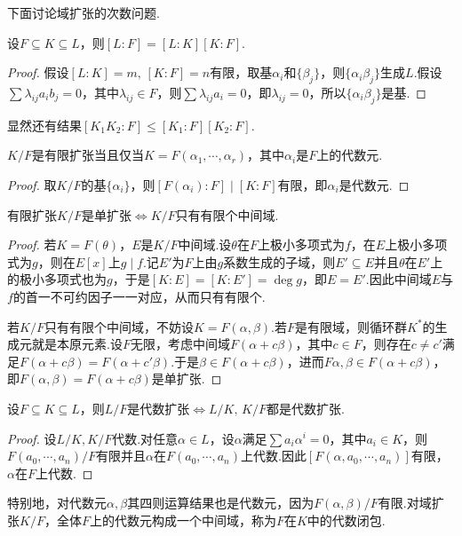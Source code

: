 下面讨论域扩张的次数问题.
\begin{prop}
    设$F\subseteq K\subseteq L$，则$[L:F]=[L:K][K:F]$.
\end{prop}
\begin{proof}
    假设$[L:K]=m,\,[K:F]=n$有限，取基${\alpha_i}$和$\{\beta_j\}$，则$\{\alpha_i\beta_j\}$生成$L$.假设$\sum\lambda_{ij}a_ib_j=0$，其中$\lambda_{ij}\in F$，则$\sum\lambda_{ij}a_i=0$，即$\lambda_{ij}=0$，所以$\{\alpha_i\beta_j\}$是基.
\end{proof}
\begin{remark}
    显然还有结果$[K_1K_2:F]\le[K_1:F][K_2:F]$.
\end{remark}
\begin{prop}
    $K/F$是有限扩张当且仅当$K=F(\alpha_1,\cdots,\alpha_r)$，其中$\alpha_i$是$F$上的代数元.
\end{prop}
\begin{proof}
    取$K/F$的基$\{\alpha_i\}$，则$[F(\alpha_i):F]\mid[K:F]$有限，即$\alpha_i$是代数元.
\end{proof}
\begin{prop}
    有限扩张$K/F$是单扩张$\iff K/F$只有有限个中间域.
\end{prop}
\begin{proof}
    若$K=F(\theta)$，$E$是$K/F$中间域.设$\theta$在$F$上极小多项式为$f$，在$E$上极小多项式为$g$，则在$E[x]$上$g\mid f$.记$E'$为$F$上由$g$系数生成的子域，则$E'\subseteq E$并且$\theta$在$E'$上的极小多项式也为$g$，于是$[K:E]=[K:E']=\deg g$，即$E=E'$.因此中间域$E$与$f$的首一不可约因子一一对应，从而只有有限个.

    若$K/F$只有有限个中间域，不妨设$K=F(\alpha,\beta)$.若$F$是有限域，则循环群$K^*$的生成元就是本原元素.设$F$无限，考虑中间域$F(\alpha+c\beta)$，其中$c\in F$，则存在$c\ne c'$满足$F(\alpha+c\beta)=F(\alpha+c'\beta)$.于是$\beta\in F(\alpha+c\beta)$，进而$F\alpha,\beta\in F(\alpha+c\beta)$，即$F(\alpha,\beta)=F(\alpha+c\beta)$是单扩张.
\end{proof}
\begin{prop}
    设$F\subseteq K\subseteq L$，则$L/F$是代数扩张$\iff L/K,\,K/F$都是代数扩张.
\end{prop}
\begin{proof}
    设$L/K,K/F$代数.对任意$\alpha\in L$，设$\alpha$满足$\sum a_i\alpha^i=0$，其中$a_i\in K$，则$F(a_0,\cdots,a_n)/F$有限并且$\alpha$在$F(a_0,\cdots,a_n)$上代数.因此$[F(\alpha,a_0,\cdots,a_n)]$有限，$\alpha$在$F$上代数.
\end{proof}

特别地，对代数元$\alpha,\beta$其四则运算结果也是代数元，因为$F(\alpha,\beta)/F$有限.对域扩张$K/F$，全体$F$上的代数元构成一个中间域，称为$F$在$K$中的{\heiti 代数闭包}.

